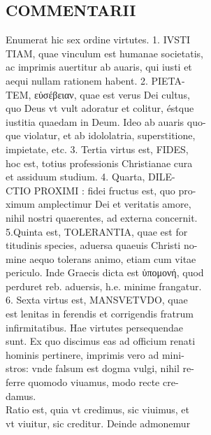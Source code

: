 \documentclass{article}
\begin{document}
\begin{pages}
\section*{COMMENTARII \\
                }
Enumerat hic sex ordine virtutes. 1. IVSTI \\
                TIAM, quae vinculum est humanae societatis, \\
                ac imprimis auertitur ab auaris, qui iusti et \\
                aequi nullam rationem habent. 2. PIETA- \\
                TEM, εὐσέβειαν, quae est verus Dei cultus, \\
                quo Deus vt vult adoratur et colitur, éstque \\
                iustitia quaedam in Deum. Ideo ab auaris quo- \\
                que violatur, et ab idololatria, superstitione, \\
                impietate, etc. 3. Tertia virtus est, FIDES, \\
                hoc est, totius professionis Christianae cura \\
                et assiduum studium. 4. Quarta, DILE- \\
                CTIO PROXIMI : fidei fructus est, quo pro- \\
                ximum amplectimur Dei et veritatis amore, \\
                nihil nostri quaerentes, ad externa concernit. \\
                5.Quinta est, TOLERANTIA, quae est for \\
                titudinis species, aduersa quaeuis Christi no- \\
                mine aequo tolerans animo, etiam cum vitae \\
                periculo. Inde Graecis dicta est ὑπομονή, quod \\
                perduret reb. aduersis, h.e. minime frangatur. \\
                6. Sexta virtus est, MANSVETVDO, quae \\
                est lenitas in ferendis et corrigendis fratrum \\
                infirmitatibus. Hae virtutes persequendae \\
                sunt. Ex quo discimus eas ad officium renati \\
                hominis pertinere, imprimis vero ad mini- \\
                stros: vnde falsum est dogma vulgi, nihil re- \\
                ferre quomodo viuamus, modo recte cre- \\
                damus. \\
                Ratio est, quia vt credimus, sic viuimus, et \\
                vt viuitur, sic creditur. Deinde admonemur \\
                

\end{pages}
\end{document}
